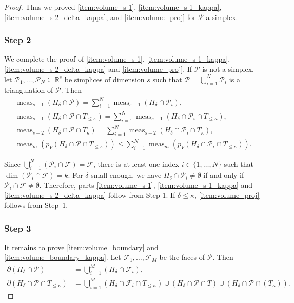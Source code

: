 \documentclass[11pt]{article}
\numberwithin{equation}{section}
\let\del\delta
\newcommand{\calP}{\mathcal{P}}
\newcommand\RR{\mathbb{R}}
\DeclareMathOperator{\meas}{meas}
\theoremstyle{definition}
\numberwithin{theorem}{section}
\begin{document}
\begin{proof}
Thus we proved \eqref{item:volume_s-1}, \eqref{item:volume_s-1_kappa}, \eqref{item:volume_s-2_delta_kappa}, and \eqref{item:volume_proj} for $\mathcal P$ a simplex.

\subsubsection*{Step 2} We complete the proof of \eqref{item:volume_s-1}, \eqref{item:volume_s-1_kappa}, \eqref{item:volume_s-2_delta_kappa} and \eqref{item:volume_proj}. If $\mathcal P$ is not a simplex,
let $\mathcal P_1,\dots,\mathcal P_N\subseteq\RR^s$ be simplices of dimension $s$
such that $\mathcal P=\bigcup_{i=1}^N\mathcal P_i$ is a triangulation of $\mathcal P$.
Then
\begin{gather*}
\meas_{s-1}(H_\delta\cap\mathcal P)=\sum_{i=1}^N\meas_{s-1}(H_\delta\cap\mathcal P_i),\\
\meas_{s-1}(H_\delta\cap\mathcal P\cap T_{\leq\kappa})
=\sum_{i=1}^N\meas_{s-1}(H_\delta\cap\mathcal P_i\cap T_{\leq\kappa}),\\
\meas_{s-2} (H_\delta \cap \mathcal P \cap T_{\kappa})
=\sum_{i=1}^N\meas_{s-2} (H_\delta \cap \mathcal P_i \cap T_{\kappa}),\\
\meas_m (p_V(H_\delta\cap \mathcal P\cap T_{\leq\kappa}))\leq\sum_{i=1}^N\meas_m (p_V(H_\delta\cap \mathcal P_i\cap T_{\leq\kappa})).
\end{gather*}

Since $\bigcup_{i=1}^N(\mathcal P_i\cap\mathcal F)=\mathcal F$,
there is at least one index $i\in\{1,\dots,N\}$ such that $\dim(\mathcal P_i\cap\mathcal F)=k$.
For $\delta$ small enough, we have $H_\delta\cap\mathcal P_i\neq\emptyset$ if and only if
$\mathcal P_i\cap\mathcal F\neq\emptyset$.
Therefore, parts \eqref{item:volume_s-1}, \eqref{item:volume_s-1_kappa}
and \eqref{item:volume_s-2_delta_kappa} follow from Step 1. If $\delta\leq\kappa$, \eqref{item:volume_proj} follows from Step~1.

\subsubsection*{Step 3} It remains to prove \eqref{item:volume_boundary} and \eqref{item:volume_boundary_kappa}.
Let $\mathcal F_1,\dots, \mathcal F_M$ be the faces of $\mathcal P$. Then
\begin{align*}
\partial (H_{\del}\cap \calP)
&=\bigcup_{i=1}^M (H_{\del}\cap \mathcal F_i),\\
\partial (H_{\del}\cap \calP\cap T_{\leq\kappa})
&=\bigcup_{i=1}^M (H_{\del}\cap \mathcal F_i\cap T_{\leq\kappa})
\cup (H_{\del}\cap \calP\cap T)
\cup (H_{\del}\cap \calP\cap (T_{\kappa})).
\end{align*}


\end{proof}
\end{document}
